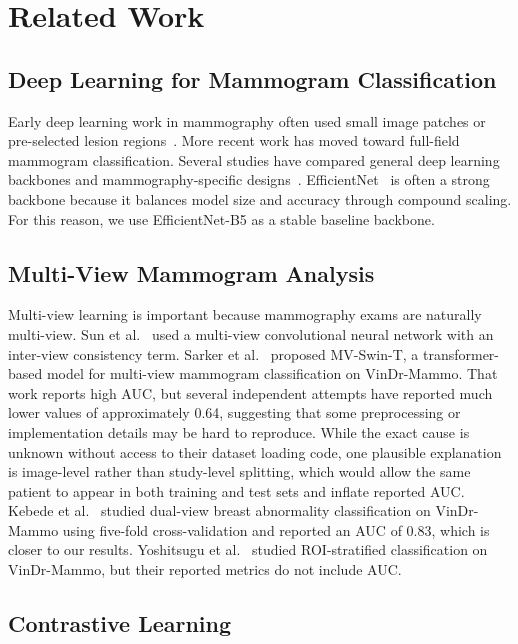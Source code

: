 \documentclass[runningheads]{llncs}
\begin{document}
\section{Related Work}
\label{sec:related}

\subsection{Deep Learning for Mammogram Classification}

Early deep learning work in mammography often used small image patches or pre-selected lesion regions~\cite{shen2019deep}. More recent work has moved toward full-field mammogram classification. Several studies have compared general deep learning backbones and mammography-specific designs~\cite{sharma2025comparative}. EfficientNet~\cite{tan2019efficientnet} is often a strong backbone because it balances model size and accuracy through compound scaling. For this reason, we use EfficientNet-B5 as a stable baseline backbone.

\subsection{Multi-View Mammogram Analysis}

Multi-view learning is important because mammography exams are naturally multi-view. Sun et al.~\cite{sun2022multiview} used a multi-view convolutional neural network with an inter-view consistency term. Sarker et al.~\cite{sarker2024mvswint} proposed MV-Swin-T, a transformer-based model for multi-view mammogram classification on VinDr-Mammo. That work reports high AUC, but several independent attempts have reported much lower values of approximately 0.64, suggesting that some preprocessing or implementation details may be hard to reproduce. While the exact cause is unknown without access to their dataset loading code, one plausible explanation is image-level rather than study-level splitting, which would allow the same patient to appear in both training and test sets and inflate reported AUC. Kebede et al.~\cite{kebede2024dual} studied dual-view breast abnormality classification on VinDr-Mammo using five-fold cross-validation and reported an AUC of 0.83, which is closer to our results. Yoshitsugu et al.~\cite{yoshitsugu2026roi} studied ROI-stratified classification on VinDr-Mammo, but their reported metrics do not include AUC.

\subsection{Contrastive Learning}
\end{document}
